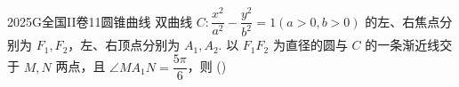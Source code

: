 
\begin{problem}{2025}{G}{全国II卷}{11}{圆锥曲线}
双曲线 $C: \dfrac{x^2}{a^2} - \dfrac{y^2}{b^2} = 1 (a>0, b>0)$ 的左、右焦点分别为 $F_1, F_2$，左、右顶点分别为 $A_1, A_2$. 以 $F_1 F_2$ 为直径的圆与 $C$ 的一条渐近线交于 $M,N$ 两点，且 $\angle MA_1N = \dfrac{5\pi}{6}$，则
(\hspace{1cm})
\begin{choices}[2]
\end{choices}
\end{problem}